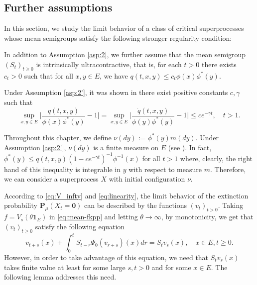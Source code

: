 \subsection{Further assumptions}\label{sec:further_assumptions}
	In this section, we study the limit behavior of a class of critical superprocesses whose mean semigroups satisfy the following stronger regularity condition:
\begin{asp}
\label{asp:2'}
	In addition to Assumption \ref{asp:2}, we further assume that the mean semigroup $(S_t)_{t\geq 0}$ is intrinsically ultracontractive,
	that is, for each $t>0$ there exists $c_t>0$ such that for all $x,y\in E$, we have $q(t,x,y)\leq c_t\phi(x)\phi^*(y)$.
\end{asp}
	Under Assumption \ref{asp:2'}, it was shown in \cite{KimSong2008Intrinsic} there exist positive constants $c, \gamma$ such that
\begin{equation}
\label{eq:IU}
	\sup_{x,y\in E} \Big| \frac {q(t,x,y)} {\phi(x)\phi^*(y)} - 1\Big|
	= \sup_{x,y\in E} \Big| \frac { \dot{q}(t,x,y)} {\phi(y)\phi^*(y)} - 1\Big|
	\leq c e^{-\gamma t},
	\quad t>1.
\end{equation}
\par
	Throughout this chapter, we define $\nu(dy) := \phi^*(y)m(dy)$.
	Under Assumption \ref{asp:2'}, $\nu(dy)$ is a finite measure on $E$ (see \cite{RenSongZhang2015Limit}).
	In fact, $\phi^*(y) \leq q(t,x,y)  (1-c e^{-\gamma t})^{-1}\phi^{-1}(x)$ for all $t>1$ where, clearly, the right hand of this inequality is integrable in $y$ with respect to measure $m$.
    Therefore, we can consider a superprocess $X$ with initial configuration $\nu$.
\par
	According to \eqref{eq:V_infty} and \eqref{eq:linearity}, the limit behavior of the extinction probability $\mathbf P_\mu(X_t = \mathbf 0)$ can be described by the functions $(v_t)_{t > 0}$.
	Taking $f=V_s(\theta \mathbf 1_E)$ in \eqref{eq:mean-fkpp} and letting $\theta \to \infty$, by monotonicity, we get that $(v_t)_{t\geq 0}$ satisfy the following equation
\begin{equation}\label{eq:reason-for-asp2'}
	v_{t+s}(x) + \int_0^tS_{t-r}\Psi_0(v_{r+s})(x) dr
	= S_tv_s(x),
	\quad x\in E,t\geq 0.
\end{equation}
	However, in order to take advantage of this equation, we need that $S_t v_s(x)$ takes finite value at least for some large $s,t>0$ and for some $x\in E$.
	The following lemma addresses this need.
